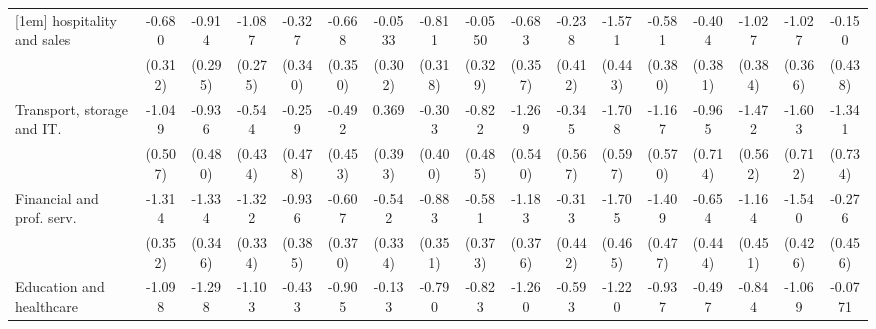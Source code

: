 {\begin{tabular}{l*{16}{c}}
[1em]
hospitality and sales&      -0.680\sym{*}  &      -0.914\sym{**} &      -1.087\sym{***}&      -0.327         &      -0.668         &     -0.0533         &      -0.811\sym{*}  &     -0.0550         &      -0.683         &      -0.238         &      -1.571\sym{***}&      -0.581         &      -0.404         &      -1.027\sym{**} &      -1.027\sym{**} &      -0.150         \\
                    &     (0.312)         &     (0.295)         &     (0.275)         &     (0.340)         &     (0.350)         &     (0.302)         &     (0.318)         &     (0.329)         &     (0.357)         &     (0.412)         &     (0.443)         &     (0.380)         &     (0.381)         &     (0.384)         &     (0.366)         &     (0.438)         \\
[1em]
Transport, storage and IT.&      -1.049\sym{*}  &      -0.936         &      -0.544         &      -0.259         &      -0.492         &       0.369         &      -0.303         &      -0.822         &      -1.269\sym{*}  &      -0.345         &      -1.708\sym{**} &      -1.167\sym{*}  &      -0.965         &      -1.472\sym{**} &      -1.603\sym{*}  &      -1.341         \\
                    &     (0.507)         &     (0.480)         &     (0.434)         &     (0.478)         &     (0.453)         &     (0.393)         &     (0.400)         &     (0.485)         &     (0.540)         &     (0.567)         &     (0.597)         &     (0.570)         &     (0.714)         &     (0.562)         &     (0.712)         &     (0.734)         \\
[1em]
Financial and prof. serv.&      -1.314\sym{***}&      -1.334\sym{***}&      -1.322\sym{***}&      -0.936\sym{*}  &      -0.607         &      -0.542         &      -0.883\sym{*}  &      -0.581         &      -1.183\sym{**} &      -0.313         &      -1.705\sym{***}&      -1.409\sym{**} &      -0.654         &      -1.164\sym{**} &      -1.540\sym{***}&      -0.276         \\
                    &     (0.352)         &     (0.346)         &     (0.334)         &     (0.385)         &     (0.370)         &     (0.334)         &     (0.351)         &     (0.373)         &     (0.376)         &     (0.442)         &     (0.465)         &     (0.477)         &     (0.444)         &     (0.451)         &     (0.426)         &     (0.456)         \\
[1em]
Education and healthcare&      -1.098\sym{**} &      -1.298\sym{***}&      -1.103\sym{***}&      -0.433         &      -0.905\sym{*}  &      -0.133         &      -0.790\sym{*}  &      -0.823\sym{*}  &      -1.260\sym{***}&      -0.593         &      -1.220\sym{**} &      -0.937\sym{*}  &      -0.497         &      -0.844\sym{*}  &      -1.069\sym{**} &     -0.0771         \\

\end{tabular}}
